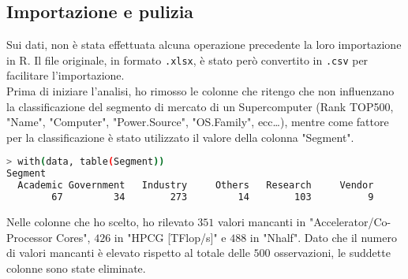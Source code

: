 \documentclass[11pt,a4paper]{article}
\begin{document}
\subsection{Importazione e pulizia}
Sui dati, non \`e stata effettuata alcuna operazione precedente la loro
importazione in R. Il file originale, in formato \texttt{.xlsx}, \`e stato
per\`o convertito in \texttt{.csv} per facilitare l'importazione.\\
Prima di iniziare l'analisi, ho rimosso le colonne che ritengo che non
influenzano la classificazione del segmento di mercato di un Supercomputer
(Rank TOP500, "Name", "Computer", "Power.Source", "OS.Family", ecc\dots), mentre
come fattore per la classificazione \`e stato utilizzato il valore della colonna
"Segment".
\begin{lstlisting}[language=bash,basicstyle=\footnotesize,tabsize=2,frame = single]
> with(data, table(Segment))
Segment
  Academic Government   Industry     Others   Research     Vendor 
        67         34        273         14        103          9
\end{lstlisting}
Nelle colonne che ho scelto, ho rilevato $351$ valori mancanti in
"Accelerator/Co-Processor Cores", $426$ in "HPCG [TFlop/s]" e $488$ in
"Nhalf". Dato che il numero di valori mancanti \`e elevato rispetto al
totale delle $500$ osservazioni, le suddette colonne sono state eliminate.
\end{document}
